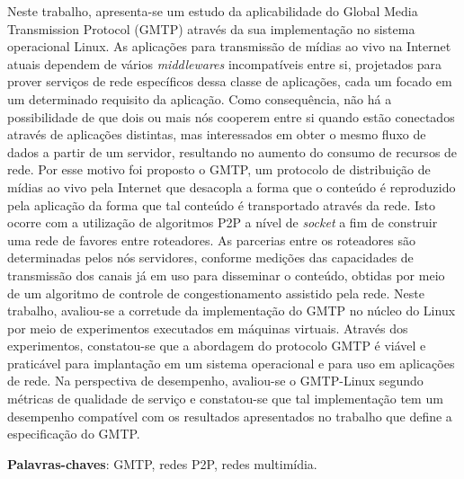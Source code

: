 

\setlength{\absparsep}{18pt} %
\begin{resumo}

Neste trabalho, apresenta-se um estudo da aplicabilidade do Global Media Transmission Protocol (GMTP) através da sua implementação no sistema operacional Linux. 
As aplicações para transmissão de mídias ao vivo na Internet atuais dependem de vários \textit{middlewares} incompatíveis entre si, projetados para prover serviços de rede específicos dessa classe de aplicações, cada um focado em um determinado requisito da aplicação. 
Como consequência, não há a possibilidade de que dois ou mais nós cooperem entre si quando estão conectados através de aplicações distintas, mas interessados em obter o mesmo fluxo de dados a partir de um servidor, resultando no aumento do consumo de recursos de rede. 
Por esse motivo foi proposto o GMTP, um protocolo de distribuição de mídias ao vivo pela Internet que desacopla a forma que o conteúdo é reproduzido pela aplicação da forma que tal conteúdo é transportado através da rede. 
Isto ocorre com a utilização de algoritmos P2P a nível de \textit{socket} a fim de construir uma rede de favores entre roteadores. As parcerias entre os roteadores são determinadas pelos nós servidores, conforme medições das capacidades de transmissão dos canais já em uso para disseminar o conteúdo, obtidas por meio de um algoritmo de controle de congestionamento assistido pela rede. 
Neste trabalho, avaliou-se a corretude da implementação do GMTP no núcleo do Linux por meio de experimentos executados em máquinas virtuais. Através dos experimentos, constatou-se que a abordagem do protocolo GMTP é viável e praticável para implantação em um sistema operacional e para uso em aplicações de rede. Na perspectiva de desempenho, avaliou-se o GMTP-Linux segundo métricas de qualidade de serviço e constatou-se que tal implementação tem um desempenho compatível com os resultados apresentados no trabalho que define a especificação do GMTP.
  
 \vspace{\onelineskip}
 
 \noindent 
 \textbf{Palavras-chaves}: GMTP, redes P2P, redes multimídia.
\end{resumo}

